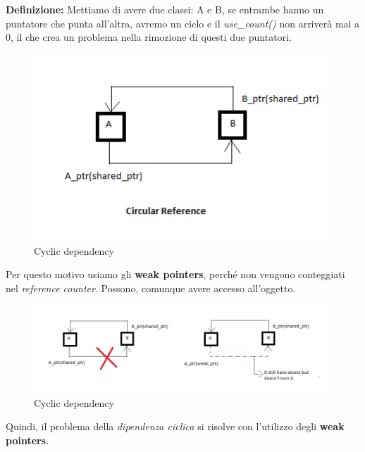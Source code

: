 \textsf{\small \textbf{Definizione: } Mettiamo di avere due classi: A e B, se entrambe hanno un puntatore che punta all'altra, avremo un ciclo e il \emph{use\_count()} non arriverà mai a 0, il che crea un problema nella rimozione di questi due puntatori.} \\

\begin{figure}[H]
	\centering
	\includegraphics[width=1\textwidth, height=1\textheight, keepaspectratio]{./imgs/shared_ptr_problem_cyclic_dependency.jpg}
	\caption{Cyclic dependency}
	\label{fig:shared_ptr_problem_cyclic_dependency}
\end{figure}

\textsf{\small Per questo motivo usiamo gli \textbf{weak pointers}, perché non vengono conteggiati nel \emph{reference counter}. Possono, comunque avere accesso all'oggetto.} \\

\begin{figure}[H]
	\centering
	\includegraphics[width=1.2\textwidth, height=1.2\textheight, keepaspectratio]{./imgs/shared_ptr_problem_cyclic_dependency2.jpg}
	\caption{Cyclic dependency}
	\label{fig:shared_ptr_problem_cyclic_dependency2}
\end{figure}

\textsf{\small Quindi, il problema della \emph{dipendenza ciclica} si risolve con l'utilizzo degli \textbf{weak pointers}.} \\

